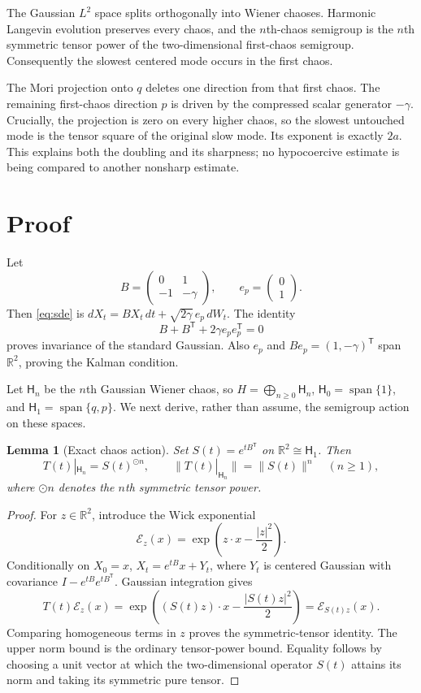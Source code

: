 \documentclass[11pt]{article}
\newtheorem{lemma}{Lemma}
\theoremstyle{remark}
\newcommand{\HH}{\mathsf H}
\newcommand{\R}{\mathbb R}
\begin{document}
The Gaussian $L^2$ space splits orthogonally into Wiener chaoses.  Harmonic
Langevin evolution preserves every chaos, and the $n$th-chaos semigroup is
the $n$th symmetric tensor power of the two-dimensional first-chaos
semigroup.  Consequently the slowest centered mode occurs in the first
chaos.

The Mori projection onto $q$ deletes one direction from that first chaos.
The remaining first-chaos direction $p$ is driven by the compressed scalar
generator $-\gamma$.  Crucially, the projection is zero on every higher
chaos, so the slowest untouched mode is the tensor square of the original
slow mode.  Its exponent is exactly $2a$.  This explains both the doubling
and its sharpness; no hypocoercive estimate is being compared to another
nonsharp estimate.

\section{Proof}

Let
\[
 B=\begin{pmatrix}0&1\\-1&-\gamma\end{pmatrix},
 \qquad e_p=\begin{pmatrix}0\\1\end{pmatrix}.
\]
Then \eqref{eq:sde} is $dX_t=BX_t\,dt+\sqrt{2\gamma}\,e_p\,dW_t$.
The identity
\[
 B+B^{\mathsf T}+2\gamma e_pe_p^{\mathsf T}=0
\]
proves invariance of the standard Gaussian.  Also $e_p$ and
$Be_p=(1,-\gamma)^{\mathsf T}$ span $\R^2$, proving the Kalman condition.

Let $\HH_n$ be the $n$th Gaussian Wiener chaos, so
$H=\bigoplus_{n\geq0}\HH_n$, $\HH_0=\operatorname{span}\{1\}$, and
$\HH_1=\operatorname{span}\{q,p\}$.  We next derive, rather than assume, the
semigroup action on these spaces.

\begin{lemma}[Exact chaos action]\label{lem:chaos}
Set $S(t)=e^{tB^{\mathsf T}}$ on $\R^2\cong\HH_1$.  Then
\[
 T(t)|_{\HH_n}=S(t)^{\odot n},
 \qquad
 \|T(t)|_{\HH_n}\|=\|S(t)\|^n
 \quad(n\geq1),
\]
where $\odot n$ denotes the $n$th symmetric tensor power.
\end{lemma}

\begin{proof}
For $z\in\R^2$, introduce the Wick exponential
\[
 \mathcal E_z(x)=\exp\!\left(z\cdot x-\frac{|z|^2}{2}\right).
\]
Conditionally on $X_0=x$, $X_t=e^{tB}x+Y_t$, where $Y_t$ is centered Gaussian
with covariance $I-e^{tB}e^{tB^{\mathsf T}}$.  Gaussian integration gives
\[
 T(t)\mathcal E_z(x)
 =\exp\!\left((S(t)z)\cdot x-\frac{|S(t)z|^2}{2}\right)
 =\mathcal E_{S(t)z}(x).
\]
Comparing homogeneous terms in $z$ proves the symmetric-tensor identity.
The upper norm bound is the ordinary tensor-power bound.  Equality follows
by choosing a unit vector at which the two-dimensional operator $S(t)$
attains its norm and taking its symmetric pure tensor.
\end{proof}
\end{document}
